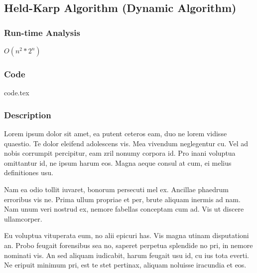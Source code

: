 \subsection{Held-Karp Algorithm (Dynamic Algorithm)}
\subsubsection{Run-time Analysis}
$O(n^2 * 2^n)$
\subsubsection{Code}

{code.tex}

\subsubsection{Description}
Lorem ipsum dolor sit amet, ea putent ceteros eam, duo ne lorem vidisse quaestio. Te dolor eleifend adolescens vis. Mea vivendum neglegentur cu. Vel ad nobis corrumpit percipitur, eam zril nonumy corpora id. Pro inani voluptua omittantur id, ne ipsum harum eos. Magna aeque consul at cum, ei melius definitiones usu.

Nam ea odio tollit iuvaret, bonorum persecuti mel ex. Ancillae phaedrum erroribus vis ne. Prima ullum propriae et per, brute aliquam inermis ad nam. Nam unum veri nostrud ex, nemore fabellas conceptam cum ad. Vis ut discere ullamcorper.

Eu voluptua vituperata eum, no alii epicuri has. Vis magna utinam disputationi an. Probo feugait forensibus sea no, saperet perpetua splendide no pri, in nemore nominati vis. An sed aliquam iudicabit, harum feugait usu id, cu ius tota everti. Ne eripuit minimum pri, est te stet pertinax, aliquam noluisse iracundia et eos.
